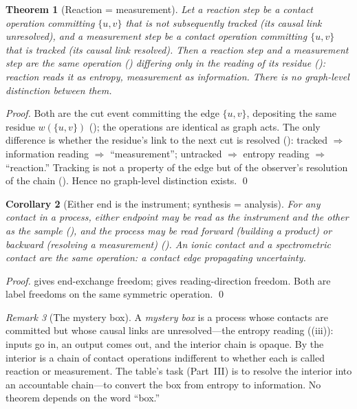 \documentclass[11pt,a4paper]{article}
\theoremstyle{thmstyle}
\newtheorem{theorem}{Theorem}[section]
\newtheorem{corollary}[theorem]{Corollary}
\theoremstyle{definition}
\theoremstyle{remark}
\newtheorem{remark}[theorem]{Remark}
\newcommand{\wt}{w}
\begin{document}
\begin{theorem}[Reaction = measurement]
\label{thm:reaction-measurement}
Let a \emph{reaction step} be a contact operation committing $\{u,v\}$ that
is not subsequently tracked (its causal link unresolved), and a
\emph{measurement step} be a contact operation committing $\{u,v\}$ that is
tracked (its causal link resolved). Then a reaction step and a measurement
step are the same operation () differing only in the
reading of its residue (): reaction reads it as
entropy, measurement as information. There is no graph-level distinction
between them.
\end{theorem}

\begin{proof}
Both are the cut event committing the edge $\{u,v\}$, depositing the same
residue $\wt(\{u,v\})$ (); the operations are
identical as graph acts. The only difference is whether the residue's link
to the next cut is resolved (): tracked
$\Rightarrow$ information reading $\Rightarrow$ ``measurement''; untracked
$\Rightarrow$ entropy reading $\Rightarrow$ ``reaction.'' Tracking is not a
property of the edge but of the observer's resolution of the chain
(). Hence no graph-level distinction exists. \qed
\end{proof}

\begin{corollary}[Either end is the instrument; synthesis = analysis]
\label{cor:either-end}
For any contact in a process, either endpoint may be read as the
instrument and the other as the sample (), and the
process may be read forward (building a product) or backward (resolving a
measurement) (). An ionic contact and a
spectrometric contact are the same operation: a contact edge propagating
uncertainty.
\end{corollary}

\begin{proof}
 gives end-exchange freedom;
 gives reading-direction freedom. Both are
label freedoms on the same symmetric operation. \qed
\end{proof}

\begin{remark}[The mystery box]
\label{rem:box}
A \emph{mystery box} is a process whose contacts are committed but whose
causal links are unresolved---the entropy reading
((iii)): inputs go in, an output comes out, and
the interior chain is opaque. By  the
interior is a chain of contact operations indifferent to whether each is
called reaction or measurement. The table's task (Part~III) is to resolve
the interior into an accountable chain---to convert the box from entropy to
information. No theorem depends on the word ``box.''
\end{remark}
\end{document}
